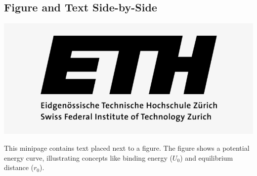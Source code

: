 \subsection{Figure and Text Side-by-Side}
\begin{minipage}[c]{0.5\linewidth}
    \includegraphics[width=\linewidth]{figures/example.png}
\end{minipage}\hfill
\begin{minipage}[c]{0.45\linewidth}
    This minipage contains text placed next to a figure. The figure shows a potential energy curve, illustrating concepts like binding energy ($U_0$) and equilibrium distance ($r_0$).
\end{minipage}


\endgroup